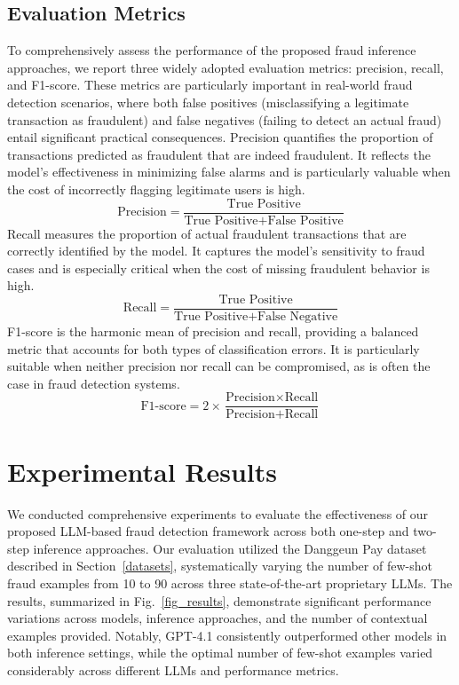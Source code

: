\documentclass[sigconf]{acmart}
\begin{document}
\subsection{Evaluation Metrics}\label{evaluation_metrics}
To comprehensively assess the performance of the proposed fraud inference approaches, we report three widely adopted evaluation metrics: precision, recall, and F1-score. These metrics are particularly important in real-world fraud detection scenarios, where both false positives (misclassifying a legitimate transaction as fraudulent) and false negatives (failing to detect an actual fraud) entail significant practical consequences.
Precision quantifies the proportion of transactions predicted as fraudulent that are indeed fraudulent. It reflects the model's effectiveness in minimizing false alarms and is particularly valuable when the cost of incorrectly flagging legitimate users is high.
\begin{equation}
 \text{Precision} = \frac{\text{True Positive}}{\text{True Positive} + \text{False Positive}}
 \end{equation}
Recall measures the proportion of actual fraudulent transactions that are correctly identified by the model. It captures the model's sensitivity to fraud cases and is especially critical when the cost of missing fraudulent behavior is high.
\begin{equation}
 \text{Recall} = \frac{\text{True Positive}}{\text{True Positive} + \text{False Negative}}
 \end{equation}
F1-score is the harmonic mean of precision and recall, providing a balanced metric that accounts for both types of classification errors. It is particularly suitable when neither precision nor recall can be compromised, as is often the case in fraud detection systems.
\begin{equation}
 \text{F1-score} = 2 \times \frac{\text{Precision} \times \text{Recall}}{\text{Precision} + \text{Recall}}
 \end{equation}




\section{Experimental Results}\label{results}
We conducted comprehensive experiments to evaluate the effectiveness of our proposed LLM-based fraud detection framework across both one-step and two-step inference approaches. Our evaluation utilized the Danggeun Pay dataset described in Section~\ref{datasets}, systematically varying the number of few-shot fraud examples from 10 to 90 across three state-of-the-art proprietary LLMs. The results, summarized in Fig.~\ref{fig_results}, demonstrate significant performance variations across models, inference approaches, and the number of contextual examples provided. Notably, GPT-4.1 consistently outperformed other models in both inference settings, while the optimal number of few-shot examples varied considerably across different LLMs and performance metrics.
\end{document}
